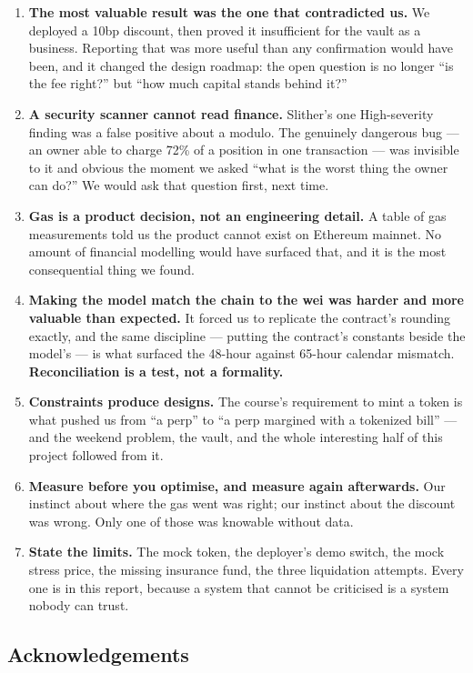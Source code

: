 \documentclass[11pt,a4paper]{article}
\begin{document}
\begin{enumerate}
  \item \textbf{The most valuable result was the one that contradicted us.} We deployed a 10bp
  discount, then proved it insufficient for the vault as a business. Reporting that was more useful
  than any confirmation would have been, and it changed the design roadmap: the open question is no
  longer ``is the fee right?'' but ``how much capital stands behind it?''
  \item \textbf{A security scanner cannot read finance.} Slither's one High-severity finding was a
  false positive about a modulo. The genuinely dangerous bug --- an owner able to charge 72\% of a
  position in one transaction --- was invisible to it and obvious the moment we asked ``what is the
  worst thing the owner can do?'' We would ask that question first, next time.
  \item \textbf{Gas is a product decision, not an engineering detail.} A table of gas measurements
  told us the product cannot exist on Ethereum mainnet. No amount of financial modelling would have
  surfaced that, and it is the most consequential thing we found.
  \item \textbf{Making the model match the chain to the wei was harder and more valuable than
  expected.} It forced us to replicate the contract's rounding exactly, and the same discipline ---
  putting the contract's constants beside the model's --- is what surfaced the 48-hour against
  65-hour calendar mismatch. \textbf{Reconciliation is a test, not a formality.}
  \item \textbf{Constraints produce designs.} The course's requirement to mint a token is what
  pushed us from ``a perp'' to ``a perp margined with a tokenized bill'' --- and the weekend problem,
  the vault, and the whole interesting half of this project followed from it.
  \item \textbf{Measure before you optimise, and measure again afterwards.} Our instinct about where
  the gas went was right; our instinct about the discount was wrong. Only one of those was knowable
  without data.
  \item \textbf{State the limits.} The mock token, the deployer's demo switch, the mock stress price,
  the missing insurance fund, the three liquidation attempts. Every one is in this report, because a system that cannot be criticised is a system
  nobody can trust.
\end{enumerate}

\subsection{Acknowledgements}
\end{document}
